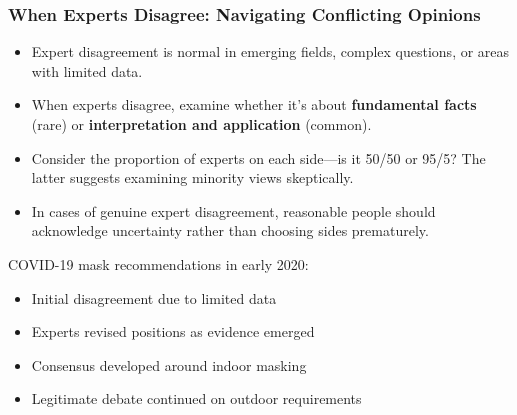 \documentclass{beamer}
\begin{document}
	\begin{frame}
		\frametitle{When Experts Disagree: Navigating Conflicting Opinions}
		\begin{itemize}
			\item Expert disagreement is normal in emerging fields, complex questions, or areas with limited data.
			\item When experts disagree, examine whether it's about \textbf{fundamental facts} (rare) or \textbf{interpretation and application} (common).
			\item Consider the proportion of experts on each side—is it 50/50 or 95/5? The latter suggests examining minority views skeptically.
			\item In cases of genuine expert disagreement, reasonable people should acknowledge uncertainty rather than choosing sides prematurely.
		\end{itemize}
		
		\begin{example}
			COVID-19 mask recommendations in early 2020:
			\begin{itemize}
				\item Initial disagreement due to limited data
				\item Experts revised positions as evidence emerged
				\item Consensus developed around indoor masking
				\item Legitimate debate continued on outdoor requirements
			\end{itemize}
		\end{example}
	\end{frame}
	
\end{document}
